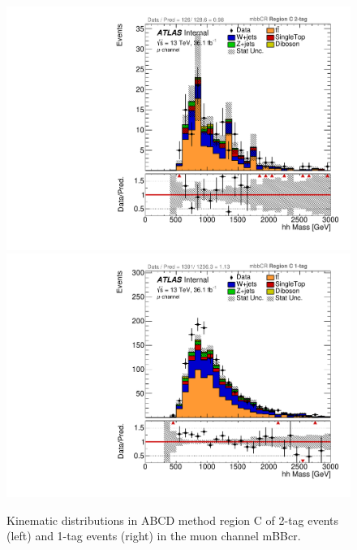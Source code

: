 \begin{figure}[!htbp]
\begin{center}
\includegraphics[scale=0.33]{./figures/boosted/ABCD_ScaledPrompt/muon_mbbcr_RegionC_hhMass}
\includegraphics[scale=0.33]{./figures/boosted/ABCD_ScaledPrompt/muon_mbbcr_RegionC_1tag_hhMass}
\caption{Kinematic distributions in ABCD method region C of 2-tag events (left) and 1-tag events (right) in the muon channel mBBcr.}
\label{fig:boosted_abcd_scaledprompt_region_c_mbbcr_muon}
\end{center}
\end{figure}


